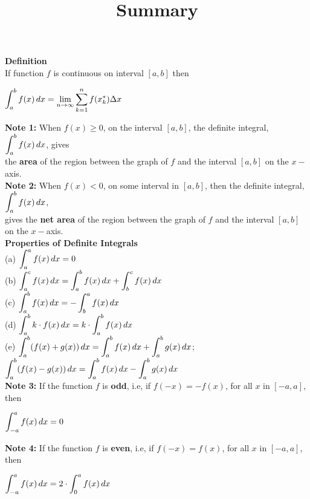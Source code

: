 \documentclass{ximera}
\title[Summary]{Summary}
\begin{document}
\begin{abstract} \end{abstract}
\maketitle


\textbf{Definition} \\
If function $f$ is continuous on interval $[a,b]$ then
\begin{center}
 {\large{$ \displaystyle \int_a^b f(x)\,d x =  \lim_{n \to \infty} \sum_{k = 1}^n f(x_k^*) \Delta x$}}\\[2em]
 \end{center}
\textbf{Note 1: } When $f(x)\ge0$, on the interval $[a,b]$, the definite integral, $ \displaystyle \int_a^b f(x)\,d x$, gives \\the \textbf{area} of the region between the graph of $f$ and the interval $[a,b]$ on the $x-$axis. \\[1em]
\textbf{Note 2: } When $f(x)<0$, on some interval in $[a,b]$, then the definite integral, $ \displaystyle \int_a^b f(x)\,d x$,\\ gives the \textbf{net area} of the region between the graph of $f$ and the interval $[a,b]$ on the $x-$axis. \\[2em]
\textbf{Properties of Definite Integrals} \\[1em]
(a) $ \displaystyle \int_a^a f(x)\,d x =0$\\[0.8em]
(b) $ \displaystyle \int_a^c f(x)\,d x =\displaystyle \int_a^b f(x)\,d x +  \displaystyle \int_b^c f(x)\,d x$\\[0.8em]
(c) $ \displaystyle \int_a^b f(x)\,d x = - \displaystyle \int_b^a f(x)\,d x $\\[0.8em]
(d) $ \displaystyle \int_a^b k\cdot f(x)\,d x = k\cdot \displaystyle \int_a^b f(x)\,d x $\\[0.8em]
(e) $ \displaystyle \int_a^b ( f(x)+g(x))\,d x = \displaystyle \int_a^b f(x)\,d x +  \displaystyle \int_a^b g(x)\,d x$; 
      $ \displaystyle \int_a^b ( f(x)-g(x))\,d x = \displaystyle \int_a^b f(x)\,d x -  \displaystyle \int_a^b g(x)\,d x$\\[2em]
      \textbf{Note 3: } If the function $f$ is \textbf{odd}, i.e, if $f(-x)=-f(x)$, for all $x$ in $[-a,a]$, then
      \begin{center}
      {\large{ $ \displaystyle \int_{-a}^a f(x)\,d x =0$}}
        \end{center}
           \textbf{Note 4: } If the function $f$ is \textbf{even}, i.e, if $f(-x)=f(x)$, for all $x$ in $[-a,a]$, then
      \begin{center}
      {\large{ $ \displaystyle \int_{-a}^a f(x)\,d x =2\cdot \displaystyle \int_{0}^a f(x)\,d x$}}
        \end{center}
\end{document}
